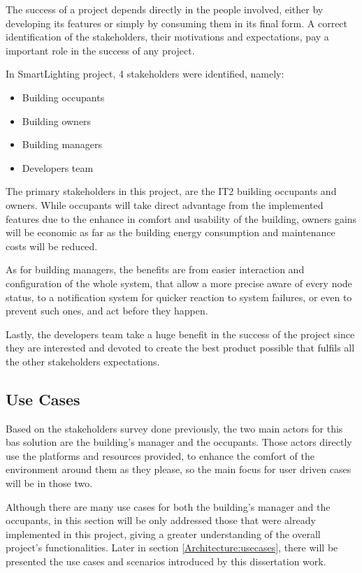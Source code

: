 The success of a project depends directly in the people involved, either by developing its features or simply by consuming them in its final form. A correct identification of the stakeholders, their motivations and expectations, pay a important role in the success of any project. 

In SmartLighting project, 4 stakeholders were identified, namely:

\begin{itemize}
	\item Building occupants
	\item Building owners
	\item Building managers
	\item Developers team
\end{itemize}


The primary stakeholders in this project, are the IT2 building occupants and owners. While occupants will take direct advantage from the implemented features due to the enhance in comfort and usability of the building, owners gains will be economic as far as the building energy consumption and maintenance costs will be reduced.

As for building managers, the benefits are from easier interaction and configuration of the whole system, that allow a more precise aware of every node status, to a notification system for quicker reaction to system failures, or even to prevent such ones, and act before they happen.

Lastly, the developers team take a huge benefit in the success of the project since they are interested and devoted to create the best product possible that fulfils all the other stakeholders expectations.


\subsection{Use Cases}
\label{Architecture:SLusecases}

Based on the stakeholders survey done previously, the two main actors for this \ac{bas} solution are the building's manager and the occupants. Those actors directly use the platforms and resources provided, to enhance the comfort of the environment around them as they please, so the main focus for user driven cases will be in those two. 

Although there are many use cases for both the building's manager and the occupants, in this section will be only addressed those that were already implemented in this project, giving a greater understanding of the overall project's functionalities. Later in section \ref{Architecture:usecases}, there will be presented the use cases and scenarios introduced by this dissertation work.


